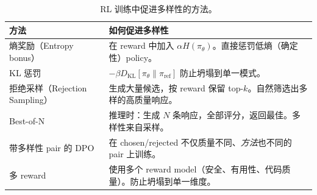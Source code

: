 \begin{table}[ht!]
\centering\small
\caption{RL 训练中促进多样性的方法。}
\noindent\begin{tabularx}{\linewidth}{@{}l Z{1}@{}}
\toprule
\textbf{方法} & \textbf{如何促进多样性} \\
\midrule
熵奖励（Entropy bonus） & 在 reward 中加入 $\alpha H(\pi_\theta)$。直接惩罚低熵（确定性）policy。 \\
KL 惩罚 & $-\beta D_\text{KL}[\pi_\theta \| \pi_\text{ref}]$ 防止坍塌到单一模式。 \\
拒绝采样（Rejection Sampling） & 生成大量候选，按 reward 保留 top-$k$。自然筛选出多样的高质量响应。 \\
Best-of-N & 推理时：生成 $N$ 条响应，全部评分，返回最佳。多样性来自采样。 \\
带多样性 pair 的 DPO & 在 chosen/rejected 不仅质量不同、\emph{方法}也不同的 pair 上训练。 \\
多 reward & 使用多个 reward model（安全、有用性、代码质量）。防止坍塌到单一维度。 \\
\bottomrule
\end{tabularx}
\end{table}

